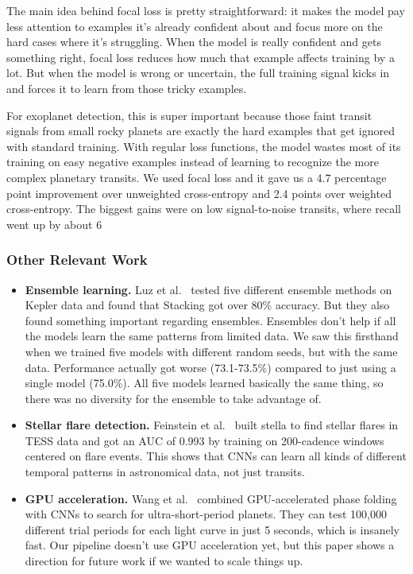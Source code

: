 \documentclass[letterpaper]{article} %
\begin{document}
The main idea behind focal loss is pretty straightforward: it makes the model pay less attention to examples it's already confident about and focus more on the hard cases where it's struggling. When the model is really confident and gets something right, focal loss reduces how much that example affects training by a lot. But when the model is wrong or uncertain, the full training signal kicks in and forces it to learn from those tricky examples.

For exoplanet detection, this is super important because those faint transit signals from small rocky planets are exactly the hard examples that get ignored with standard training. With regular loss functions, the model wastes most of its training on easy negative examples instead of learning to recognize the more complex planetary transits. We used focal loss and it gave us a 4.7 percentage point improvement over unweighted cross-entropy and 2.4 points over weighted cross-entropy. The biggest gains were on low signal-to-noise transits, where recall went up by about 6%

\subsubsection{Other Relevant Work}

\begin{itemize}
    \item \textbf{Ensemble learning.} Luz et al.~\cite{luz2024assessment} tested five different ensemble methods on Kepler data and found that Stacking got over 80\% accuracy. But they also found something important regarding ensembles. Ensembles don't help if all the models learn the same patterns from limited data. We saw this firsthand when we trained five models with different random seeds, but with the same data. Performance actually got worse (73.1-73.5\%) compared to just using a single model (75.0\%). All five models learned basically the same thing, so there was no diversity for the ensemble to take advantage of.
    
    \item \textbf{Stellar flare detection.} Feinstein et al.~\cite{Feinstein2020stella} built stella to find stellar flares in TESS data and got an AUC of 0.993 by training on 200-cadence windows centered on flare events. This shows that CNNs can learn all kinds of different temporal patterns in astronomical data, not just transits.
    
    \item \textbf{GPU acceleration.} Wang et al.~\cite{Wang2024gpfc} combined GPU-accelerated phase folding with CNNs to search for ultra-short-period planets. They can test 100,000 different trial periods for each light curve in just 5 seconds, which is insanely fast. Our pipeline doesn't use GPU acceleration yet, but this paper shows a direction for future work if we wanted to scale things up.
\end{itemize}
\end{document}
